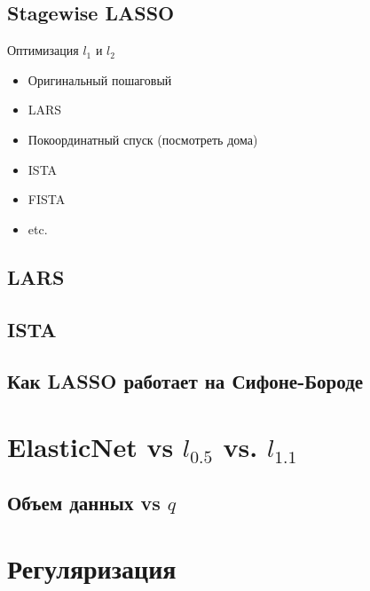 \documentclass[14pt, fleqn, xcolor={dvipsnames, table}]{beamer}
\begin{document}
\subsection{Stagewise LASSO}
\begin{frame}{Оптимизация $l_1$ и $l_2$}
\begin{itemize}
\small
  \item Оригинальный пошаговый
  \item LARS
  \item Покоординатный спуск (посмотреть дома)
  \item ISTA
  \item FISTA
  \item etc.
\end{itemize}
\end{frame}

\subsection{LARS}
\subsection{ISTA}
\subsection{Как LASSO работает на Сифоне-Бороде}
\section{ElasticNet vs $l_{0.5}$ vs. $l_{1.1}$}
\subsection{Объем данных vs $q$}
\section{Регуляризация}
\end{document}
